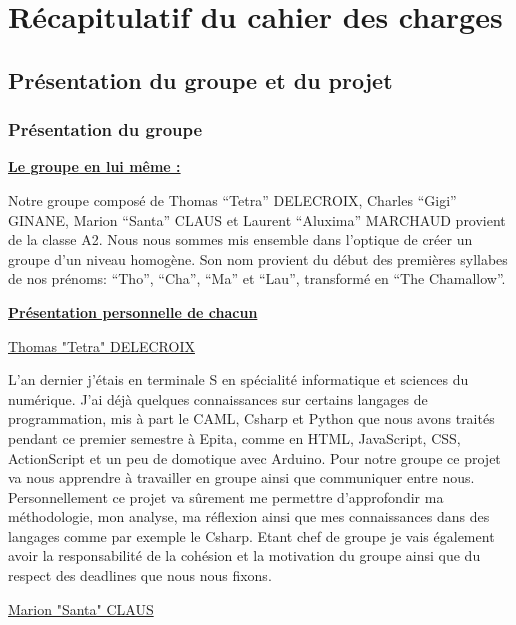 \documentclass[a4paper , 12pt]{article}
\begin{document}
\newpage

\section{Récapitulatif du cahier des charges}

\subsection{Présentation du groupe et du projet}

	\subsubsection{Présentation du groupe}

\quad

	\underline{\textbf{Le groupe en lui même :}}

\quad

    Notre groupe composé de Thomas “Tetra” DELECROIX, Charles “Gigi” GINANE, Marion “Santa” CLAUS et Laurent “Aluxima” MARCHAUD provient de la classe A2. Nous nous sommes mis ensemble dans l’optique de créer un groupe d’un niveau homogène.
Son nom provient du début des premières syllabes de nos prénoms: “Tho”, “Cha”, “Ma” et “Lau”, transformé en “The Chamallow”.
 
\quad

	\underline{\textbf{Présentation personnelle de chacun}}

\quad

		\underline{Thomas "Tetra" DELECROIX }
			
L’an dernier j’étais en terminale S en spécialité informatique et sciences du numérique. J’ai déjà quelques connaissances sur certains langages de programmation, mis à part le CAML, Csharp et Python que nous avons traités pendant ce premier semestre à Epita, comme en HTML, JavaScript, CSS, ActionScript et un peu de domotique avec Arduino. Pour notre groupe ce projet va nous apprendre à travailler en groupe ainsi que communiquer entre nous. Personnellement ce projet va sûrement me permettre d'approfondir ma méthodologie, mon analyse, ma réflexion ainsi que mes connaissances dans des langages comme par exemple le Csharp. Etant chef de groupe je vais également avoir la responsabilité de la cohésion et la motivation du groupe ainsi que du respect des deadlines que nous nous fixons.

\quad

\newpage

		\underline{Marion "Santa" CLAUS}
			
\end{document}
